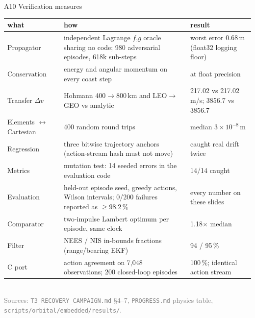 \documentclass[aspectratio=169,11pt]{beamer}
\newcommand{\dv}{\ensuremath{\Delta v}}
\begin{document}
\begin{frame}{A10 \; Verification measures}
\tiny
\begin{tabular}{@{}p{2.6cm}p{6.6cm}p{3.6cm}@{}}
\toprule
what & how & result\\
\midrule
Propagator & independent Lagrange $f$,$g$ oracle sharing no code; 980 adversarial episodes, 618k sub-steps & worst error 0.68\,m (float32 logging floor)\\
Conservation & energy and angular momentum on every coast step & at float precision\\
Transfer \dv & Hohmann 400$\to$800\,km and LEO$\to$GEO vs analytic & 217.02 vs 217.02\,m/s; 3856.7 vs 3856.7\\
Elements $\leftrightarrow$ Cartesian & 400 random round trips & median $3\times10^{-8}$\,m\\
Regression & three bitwise trajectory anchors (action-stream hash must not move) & caught real drift twice\\
Metrics & mutation test: 14 seeded errors in the evaluation code & 14/14 caught\\
Evaluation & held-out episode seed, greedy actions, Wilson intervals; 0/200 failures reported as $\ge98.2\,\%$ & every number on these slides\\
Comparator & two-impulse Lambert optimum per episode, same clock & 1.18$\times$ median\\
Filter & NEES / NIS in-bounds fractions (range/bearing EKF) & 94 / 95\,\%\\
C port & action agreement on 7,048 observations; 200 closed-loop episodes & 100\,\%; identical action stream\\
\bottomrule
\end{tabular}
\\[2mm]\textcolor{grey}{Sources: \texttt{T3\_RECOVERY\_CAMPAIGN.md} \S4--7, \texttt{PROGRESS.md} physics table, \texttt{scripts/orbital/embedded/results/}.}
\end{frame}
\end{document}
